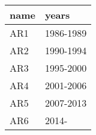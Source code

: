 \begin{tabular}{ll}
\toprule
name &      years \\
\midrule
 AR1 &  1986-1989 \\
 AR2 &  1990-1994 \\
 AR3 &  1995-2000 \\
 AR4 &  2001-2006 \\
 AR5 &  2007-2013 \\
 AR6 &      2014- \\
\bottomrule
\end{tabular}
